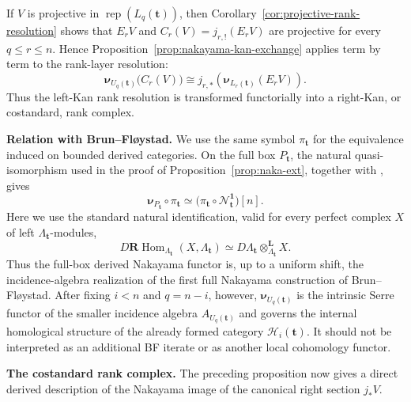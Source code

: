 \documentclass[10pt,a4paper]{amsart}
\newcommand{\Rep}{\operatorname{rep}}
\newcommand{\Hom}{\operatorname{Hom}}
\begin{document}
If $V$ is projective in $\Rep(L_q(\mathbf t))$, then Corollary~\ref{cor:projective-rank-resolution}
shows that $E_rV$ and $C_r(V)=j_{r,!}(E_rV)$ are projective for every
$q\le r\le n$.  Hence Proposition~\ref{prop:nakayama-kan-exchange} applies
term by term to the rank-layer resolution:
\[
\boldsymbol\nu_{U_q(\mathbf t)}\bigl(C_r(V)\bigr)
\cong
j_{r,*}\!\left(\boldsymbol\nu_{L_r(\mathbf t)}(E_rV)\right).
\]
Thus the left-Kan rank resolution is transformed functorially into a
right-Kan, or costandard, rank complex.

\medskip\noindent\textbf{Relation with Brun--Fl\o ystad.}
We use the same symbol $\pi_{\mathbf t}$ for the equivalence induced on
bounded derived categories.  On the full box $P_{\mathbf t}$,
the natural quasi-isomorphism used in the proof of
Proposition~\ref{prop:naka-ext}, together with
\cite[Proposition~3.9]{BF}, gives
\begin{equation}\label{eq:BF-derived-nakayama-comparison}
\boldsymbol\nu_{P_{\mathbf t}}\circ\pi_{\mathbf t}
\simeq
\bigl(\pi_{\mathbf t}\circ\mathcal N_{\mathbf t}^{\mathbf1}\bigr)[n].
\end{equation}
Here we use the standard natural identification, valid for every perfect
complex $X$ of left $\Lambda_{\mathbf t}$-modules,
\[
D\mathbf R\!\Hom_{\Lambda_{\mathbf t}}(X,\Lambda_{\mathbf t})
\simeq
D\Lambda_{\mathbf t}\otimes_{\Lambda_{\mathbf t}}^{\mathbf L}X.
\]
Thus the full-box derived Nakayama functor is, up to a uniform shift, the
incidence-algebra realization of the first full Nakayama construction of
Brun--Fl\o ystad.  After fixing $i<n$ and $q=n-i$, however,
$\boldsymbol\nu_{U_q(\mathbf t)}$ is the intrinsic Serre functor of the
smaller incidence algebra $A_{U_q(\mathbf t)}$ and governs the internal
homological structure of the already formed category
$\mathcal H_i(\mathbf t)$.  It should not be interpreted as an additional BF
iterate or as another local cohomology functor.

\medskip\noindent\textbf{The costandard rank complex.}
The preceding proposition now gives a direct derived description of the
Nakayama image of the canonical right section $j_*V$.
\end{document}
